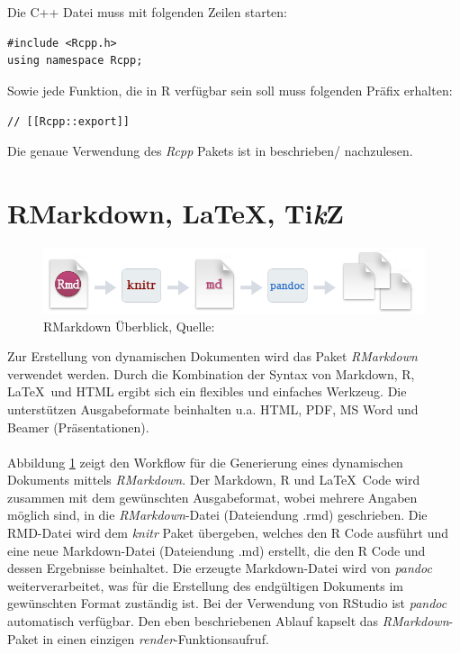 \\
\\
Die C++ Datei muss mit folgenden Zeilen starten:
\lstset{language=C++, numbers=none, basicstyle=\ttfamily}
\begin{lstlisting}
#include <Rcpp.h>
using namespace Rcpp;
\end{lstlisting}
Sowie jede Funktion, die in R verfügbar sein soll muss folgenden Präfix erhalten:
\begin{lstlisting}
// [[Rcpp::export]]
\end{lstlisting}
Die genaue Verwendung des \emph{Rcpp} Pakets ist in \cite{wickham2015advanced} beschrieben/ nachzulesen.
\section{RMarkdown, \LaTeX, Ti\textit{k}Z}
\label{kapitel:rmarkdown}
\begin{figure}[!t]
\centering
\includegraphics[width=\ScaleIfNeeded]{abbildungen/rmarkdown}
\caption{RMarkdown Überblick, Quelle: \cite{rmarkdown}}
\label{abb:rmarkdown}
\end{figure}
Zur Erstellung von dynamischen Dokumenten wird das Paket \emph{RMarkdown} verwendet werden. Durch die Kombination der Syntax von Markdown, R, \LaTeX\ und HTML ergibt sich ein flexibles und einfaches Werkzeug. Die unterstützen Ausgabeformate beinhalten u.a. HTML, PDF, MS Word und Beamer (Präsentationen).
\\
\\
Abbildung \ref{abb:rmarkdown} zeigt den Workflow für die Generierung eines dynamischen Dokuments mittels \emph{RMarkdown}. Der Markdown, R und \LaTeX\ Code wird zusammen mit dem gewünschten Ausgabeformat, wobei mehrere Angaben möglich sind, in die \emph{RMarkdown}-Datei (Dateiendung .rmd) geschrieben. Die RMD-Datei wird dem \emph{knitr} Paket übergeben, welches den R Code ausführt und eine neue Markdown-Datei (Dateiendung .md) erstellt, die den R Code und dessen Ergebnisse beinhaltet. Die erzeugte Markdown-Datei wird von \emph{pandoc} weiterverarbeitet, was für die Erstellung des endgültigen Dokuments im gewünschten Format zuständig ist. Bei der Verwendung von RStudio ist \emph{pandoc} automatisch verfügbar. Den eben beschriebenen Ablauf kapselt das \emph{RMarkdown}-Paket in einen einzigen \emph{render}-Funktionsaufruf.
